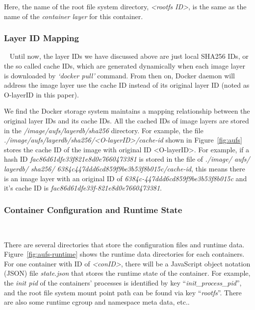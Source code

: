 Here, the name of the root file system directory, \textit{<rootfs ID>}, is the same as the name of the \textit{container layer} for this container.

\smallbreak  
\subsubsection{Layer ID Mapping}  \label{intro:aufs:layerIDMapping}
~\smallbreak
Until now, the layer IDs we have discussed above are just local SHA256 IDs, or the so called cache IDs, which are generated dynamically when each image layer is downloaded by \textit{`docker pull'} command. From then on, Docker daemon will address the image layer use the cache ID instead of its original layer ID (noted as O-layerID in this paper).

We find the Docker storage system maintains a mapping relationship between the original layer IDs and its cache IDs. All the cached IDs of image layers are stored in the \textit{/image/aufs/layerdb/sha256} directory.
For example, the file \textit{./image/aufs/layerdb/sha256/<O-layerID>/cache-id} shown in Figure~\ref{fig:aufs} stores the cache ID of the image with original ID <O-layerID>. For example, if a hash ID \textit{
fac86d61dfe33f821e8d0e7660473381} is stored in the file of \textit{./image/ aufs/ layerdb/ sha256/ 6384c447ddd6cd859f9be3b53f8b015c/cache-id}, this means there is an image layer with an original ID of \textit{
6384c-447ddd6cd859f9be3b53f8b015c} and it's cache ID is \textit{
fac86d61dfe33f-821e8d0e7660473381}.



\smallbreak  
\subsubsection{Container Configuration and Runtime State}
~\smallbreak

There are several directories that store the configuration files and runtime data. Figure~\ref{fig:aufs-runtime} shows the runtime data directories for each containers. For one container with ID of \textit{<conID>}, there will be a JavaScript object notation (JSON)  file \textit{state.json} that stores the runtime state of the container. For example, the \textit{init pid} of the containers' processes is identified by key ``\textit{init\_process\_pid}'', and the root file system mount point path can be found via key ``\textit{rootfs}''. There are also some runtime cgroup and namespace meta data, etc.. 

